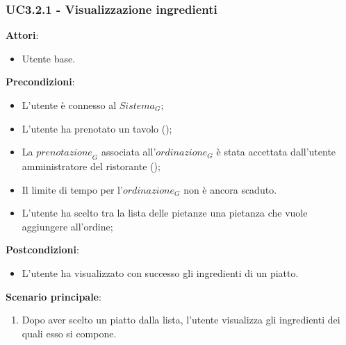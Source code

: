 \subsubsection{UC3.2.1 - Visualizzazione ingredienti
}\label{usecase:3_2_1}
\textbf{Attori}:
\begin{itemize}
    \item Utente base.
\end{itemize}
\textbf{Precondizioni}:
\begin{itemize}
    \item L'utente è connesso al $\textit{Sistema}_G$; 
    \item L'utente ha prenotato un tavolo ();
    \item La $\textit{prenotazione}_G$ associata all'$\textit{ordinazione}_G$ è stata accettata dall'utente amministratore del ristorante ();
    \item Il limite di tempo per l'$\textit{ordinazione}_G$ non è ancora scaduto.
    \item L'utente ha scelto tra la lista delle pietanze una pietanza che vuole aggiungere all'ordine;
\end{itemize}
\textbf{Postcondizioni}:
\begin{itemize}
    \item L'utente ha visualizzato con successo gli ingredienti di un piatto.
\end{itemize}
\textbf{Scenario principale}:
\begin{enumerate}
    \item Dopo aver scelto un piatto dalla lista, l'utente visualizza gli ingredienti dei quali esso si compone.
\end{enumerate}

